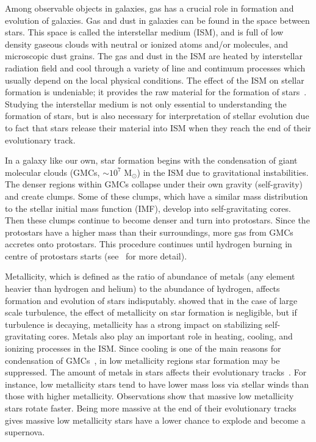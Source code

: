 Among observable objects in galaxies, gas has a crucial role in formation and evolution of galaxies.
Gas and dust in galaxies can be found in the space between stars.
This space is called the interstellar medium (ISM), and is full of low density gaseous clouds with neutral or ionized atoms and/or molecules, and microscopic dust grains.
The gas and dust in the ISM are heated by interstellar radiation field and cool through a variety of line and continuum processes which usually depend on the local physical conditions. 
The effect of the ISM on stellar formation is undeniable; it provides the raw material for the formation of stars~\citep[e.g.][]{Kennicutt08,Bigiel08}.
Studying the interstellar medium is not only essential to understanding the formation of stars, but is also  necessary for interpretation of stellar evolution due to fact that stars release their material into ISM when they reach the end of their evolutionary track.

In a galaxy like our own, star formation begins with the condensation of giant molecular clouds (GMCs, $\sim 10^7$ M$_{\odot}$) in the ISM due to gravitational instabilities. 
The denser regions within GMCs collapse under their own gravity (self-gravity) and create clumps.
Some of these clumps, which have a similar mass distribution to the stellar initial mass function (IMF), develop into self-gravitating cores.
Then these clumps continue to become denser and turn into protostars. 
Since the protostars have a higher mass than their surroundings, more gas from GMCs accretes onto protostars.
This procedure continues until hydrogen burning in centre of protostars starts (see~\cite{McKee07} for more detail). 

Metallicity, which is defined as the ratio of abundance of metals (any element heavier than hydrogen and helium) to the abundance of hydrogen, affects formation and evolution of stars indisputably.
\cite{Walch11} showed that in the case of large scale turbulence, the effect of metallicity on star formation is negligible, but if turbulence is decaying,  metallicity has a strong impact on stabilizing self-gravitating cores.
Metals also play an important role in heating, cooling, and ionizing processes in the ISM.
Since cooling is one of the main reasons for condensation of GMCs~\citep[e.g.][]{Maio07}, in low metallicity regions star formation may be suppressed. 
The amount of metals in stars affects their evolutionary tracks~\citep[e.g.][and references therein]{Maeder02}.
For instance, low metallicity stars tend to have lower mass loss via stellar winds than those with higher metallicity.
Observations show that massive low metallicity stars rotate faster.
Being more massive at the end of their evolutionary tracks gives massive low metallicity stars have a lower chance to explode and become a supernova.


